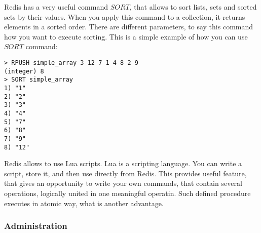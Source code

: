 Redis has a very useful command $SORT$, that allows to sort lists, sets and sorted sets by their values.
When you apply this command to a collection, it returns elements in a sorted order.
There are different parameters, to say this command how you want to execute sorting.
This is a simple example of how you can use $SORT$ command:
\begin{verbatim}
> RPUSH simple_array 3 12 7 1 4 8 2 9
(integer) 8
> SORT simple_array
1) "1"
2) "2"
3) "3"
4) "4"
5) "7"
6) "8"
7) "9"
8) "12"
\end{verbatim}

Redis allows to use Lua scripts.
Lua is a scripting language.
You can write a script, store it, and then use directly from Redis.
This provides useful feature, that gives an opportunity to write your own commands, that contain several operations, logically united in one meaningful operatin.
Such defined procedure executes in atomic way, what is another advantage.

\subsubsection{Administration}

